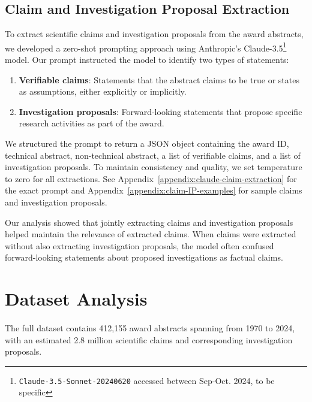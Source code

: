 \documentclass[11pt]{article}
\begin{document}
\subsection{Claim and Investigation Proposal Extraction}

To extract scientific claims and investigation proposals from the award abstracts, we developed a zero-shot prompting approach using Anthropic's Claude-3.5\footnote{\texttt{Claude-3.5-Sonnet-20240620} accessed between Sep-Oct. 2024, to be specific} model. Our prompt instructed the model to identify two types of statements:

\begin{enumerate}[noitemsep,topsep=0pt]
\item \textbf{Verifiable claims}: Statements that the abstract claims to be true or states as assumptions, either explicitly or implicitly.
\item \textbf{Investigation proposals}: Forward-looking statements that propose specific research activities as part of the award.
\end{enumerate}

We structured the prompt to return a JSON object containing the award ID, technical abstract, non-technical abstract, a list of verifiable claims, and a list of investigation proposals. To maintain consistency and quality, we set temperature to zero for all extractions. See Appendix~\ref{appendix:claude-claim-extraction} for the exact prompt and Appendix~\ref{appendix:claim-IP-examples} for sample claims and investigation proposals.

Our analysis showed that jointly extracting claims and investigation proposals helped maintain the relevance of extracted claims. When claims were extracted without also extracting investigation proposals, the model often confused forward-looking statements about proposed investigations as factual claims.

\section{Dataset Analysis}
\paragraph{\DatasetName} The full dataset contains 412,155 award abstracts spanning from 1970 to 2024, with an estimated 2.8 million scientific claims and corresponding investigation proposals.
\end{document}
